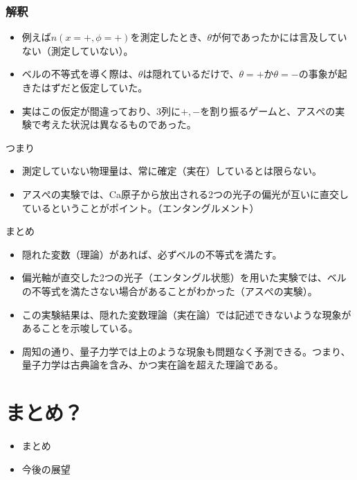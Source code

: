 \documentclass[10pt,b5paper,papersize,dvipdfmx]{jsbook}
\begin{document}
\subsubsection{解釈}

\begin{itemize}
  \item 例えば$n(x=+,\phi=+)$を測定したとき、$\theta$が何であったかには言及していない（測定していない）。
  \item ベルの不等式を導く際は、$\theta$は隠れているだけで、$\theta=+$か$\theta=-$の事象が起きたはずだと仮定していた。
  \item 実はこの仮定が間違っており、3列に$+,-$を割り振るゲームと、アスぺの実験で考えた状況は異なるものであった。
\end{itemize}

つまり

\begin{itemize}
  \item 測定していない物理量は、常に確定（実在）しているとは限らない。
  \item アスぺの実験では、Ca原子から放出される2つの光子の偏光が互いに直交しているということがポイント。（エンタングルメント）
\end{itemize}

まとめ

\begin{itemize}
  \item 隠れた変数（理論）があれば、必ずベルの不等式を満たす。
  \item 偏光軸が直交した2つの光子（エンタングル状態）を用いた実験では、ベルの不等式を満たさない場合があることがわかった（アスぺの実験）。
  \item この実験結果は、隠れた変数理論（実在論）では記述できないような現象があることを示唆している。
  \item 周知の通り、量子力学では上のような現象も問題なく予測できる。つまり、量子力学は古典論を含み、かつ実在論を超えた理論である。
\end{itemize}

\fi
\section{まとめ？}

\begin{itemize}
  \item まとめ
  \item 今後の展望
\end{itemize}
\end{document}
